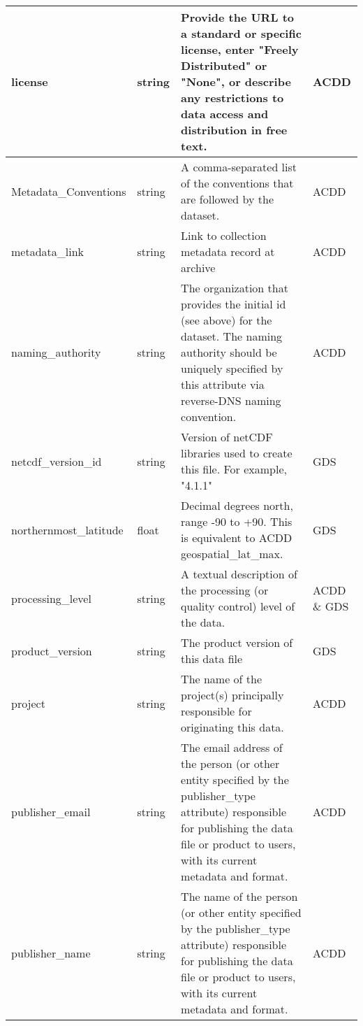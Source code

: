 \begin{longtable}{|p{}|p{}|p{}|p{}|}
\rowcolor{LightCyan} license & string & Provide the URL to a standard or specific license, enter "Freely Distributed" or "None", or describe any restrictions to data access and distribution in free text. & ACDD \\ \hline

\rowcolor{LightCyan} Metadata\_Conventions & string & A comma-separated list of the conventions that are followed by the dataset.  & ACDD \\ \hline

\rowcolor{LightCyan} metadata\_link & string & Link to collection metadata record at archive & ACDD \\ \hline

\rowcolor{LightCyan} naming\_authority & string & The organization that provides the initial id (see above) for the dataset. The naming authority should be uniquely specified by this attribute via reverse-DNS naming convention. & ACDD \\ \hline

\rowcolor{LightCyan} netcdf\_version\_id  & string & Version of netCDF libraries used to create this file. For example, "4.1.1" & GDS \\ \hline

\rowcolor{LightCyan} northernmost\_latitude & float & Decimal degrees north, range -90 to +90. This is equivalent to ACDD geospatial\_lat\_max. & GDS \\ \hline

\rowcolor{LightCyan} processing\_level & string & A textual description of the processing (or quality control) level of the data. & ACDD \& GDS \\ \hline

\rowcolor{LightCyan} product\_version & string & The product version of this data file & GDS \\ \hline

\rowcolor{LightCyan} project & string & The name of the project(s) principally responsible for originating this data. & ACDD \\ \hline

\rowcolor{LightCyan} publisher\_email & string & The email address of the person (or other entity specified by the publisher\_type attribute) responsible for publishing the data file or product to users, with its current metadata and format. & ACDD \\ \hline

\rowcolor{LightCyan} publisher\_name & string & The name of the person (or other entity specified by the publisher\_type attribute) responsible for publishing the data file or product to users, with its current metadata and format. & ACDD \\ \hline


\end{longtable}

